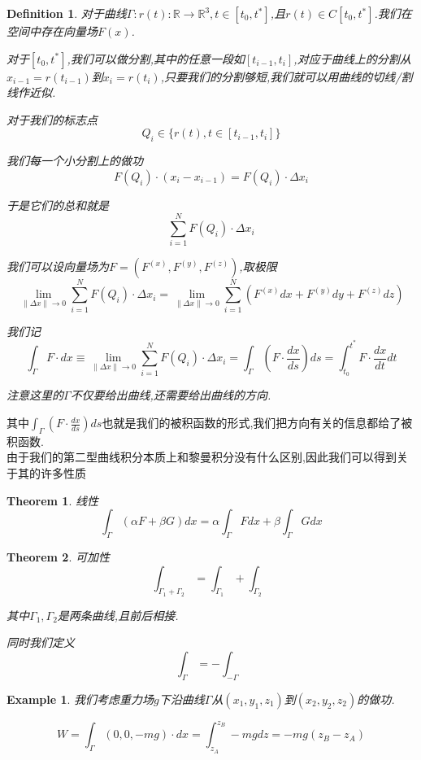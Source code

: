 \documentclass[11pt,hyperref,a4paper,UTF8]{ctexart}
\newtheorem{theorem}{Theorem}[subsection]
\newtheorem{example}{Example}[subsection]
\newtheorem{definition}{Definition}[subsection]
\newcommand{\RR}{\mathbb{R}}
\newcommand{\parameter}[1]{\left(#1\right)}
\begin{document}
\begin{CJK}{UTF8}{gkai}
\begin{definition}
对于曲线$\Gamma: r(t): \RR \to \RR^3,t \in [t_0,t^\ast]$,且$r(t) \in C[t_0,t^\ast]$.我们在空间中存在向量场$F(x)$.

对于$[t_0,t^\ast]$,我们可以做分割,其中的任意一段如$[t_{i - 1},t_i]$,对应于曲线上的分割从$x_{i - 1} = r(t_{i - 1})$到$x_i = r(t_i)$,只要我们的分割够短,我们就可以用曲线的切线/割线作近似.

对于我们的标志点
\[Q_i \in \{r(t), t \in [t_{i - 1},t_i]\}\]

我们每一个小分割上的做功
\[F(Q_i) \cdot (x_i - x_{i - 1}) = F(Q_i) \cdot \Delta x_i\]

于是它们的总和就是
\[\sum_{i = 1}^{N} F(Q_i) \cdot \Delta x_i\]

我们可以设向量场为$F = (F^{(x)},F^{(y)},F^{(z)})$,取极限
\[\lim_{\|\Delta x\|\to 0} \sum_{i = 1}^{N} F(Q_i) \cdot \Delta x_i = \lim_{\|\Delta x\| \to 0} \sum_{i = 1}^{N}(F^{(x)} dx + F^{(y)}dy + F^{(z)} dz)\]

我们记
\[\int_\Gamma F\cdot dx \equiv \lim_{\|\Delta x\|\to 0} \sum_{i = 1}^{N} F(Q_i) \cdot \Delta x_i = \int_\Gamma \parameter{F\cdot \frac{dx}{ds}} ds = \int_{t_0}^{t^\ast} F\cdot \frac{dx}{dt}dt\]

注意这里的$\Gamma$不仅要给出曲线,还需要给出曲线的方向.
\end{definition}

其中$\int_\Gamma \parameter{F\cdot \frac{dx}{ds}} ds$也就是我们的被积函数的形式,我们把方向有关的信息都给了被积函数.\\

由于我们的第二型曲线积分本质上和黎曼积分没有什么区别,因此我们可以得到关于其的许多性质

\begin{theorem}
  线性
  \[\int_\Gamma (\alpha F + \beta G) dx = \alpha\int_\Gamma F dx + \beta \int_\Gamma Gdx\]
\end{theorem}

\begin{theorem}
  可加性
  \[\int_{\Gamma_1 + \Gamma_2}  = \int_{\Gamma_1} + \int_{\Gamma_2}\]

  其中$\Gamma_1,\Gamma_2$是两条曲线,且前后相接.

  同时我们定义
  \[\int_{\Gamma} = - \int_{-\Gamma}\]
\end{theorem}

\begin{example}
  我们考虑重力场$g$下沿曲线$\Gamma$从$(x_1,y_1,z_1)$到$(x_2,y_2,z_2)$的做功.

  \[W = \int_\Gamma (0,0,-mg)\cdot dx = \int_{z_A}^{z_B} -mg dz = -mg(z_B - z_A)\]
\end{example}


\end{CJK}
\end{document}
